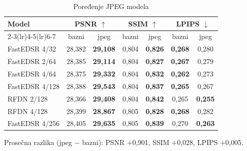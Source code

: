 \begin{table}[H]
    \begin{tabular}{lcccccc}
        \toprule
        Model & \multicolumn{2}{c}{PSNR $\uparrow$} & \multicolumn{2}{c}{SSIM $\uparrow$} & \multicolumn{2}{c}{LPIPS $\downarrow$} \\
        \cmidrule(lr){2-3}\cmidrule(lr){4-5}\cmidrule(lr){6-7}
         & bazni & jpeg & bazni & jpeg & bazni & jpeg \\
        \midrule
        FastEDSR 4/32 & 28,382 & \textbf{29,108} & 0,804 & \textbf{0,826} & \textbf{0,268} & 0,280 \\
        FastEDSR 2/64 & 28,385 & \textbf{29,114} & 0,804 & \textbf{0,827} & \textbf{0,267} & 0,279 \\
        FastEDSR 4/64 & 28,375 & \textbf{29,332} & 0,804 & \textbf{0,832} & \textbf{0,262} & 0,273 \\
        FastEDSR 4/128 & 28,388 & \textbf{29,543} & 0,804 & \textbf{0,837} & \textbf{0,265} & 0,267 \\
        RFDN 2/128 & 28,366 & \textbf{29,408} & 0,804 & \textbf{0,842} & 0,265 & \textbf{0,255} \\
        RFDN 4/128 & 28,399 & \textbf{28,867} & 0,805 & \textbf{0,828} & \textbf{0,268} & 0,282 \\
        FastEDSR 4/256 & 28,405 & \textbf{29,635} & 0,805 & \textbf{0,839} & 0,270 & \textbf{0,263} \\
        \bottomrule
    \end{tabular}
    \caption{Poređenje JPEG modela}
    \label{tab:jpeg_DIV2K_jpeg}
\end{table}

\noindent Prosečna razlika (jpeg $-$ bazni): PSNR $+$0,901, SSIM $+$0,028, LPIPS $+$0,005.